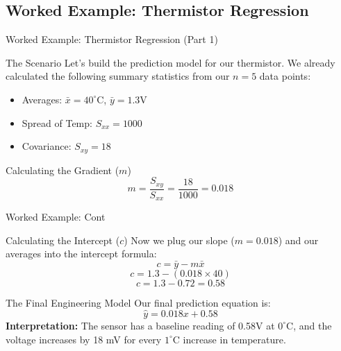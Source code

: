 \subsection{Worked Example: Thermistor Regression}
\begin{frame}{Worked Example: Thermistor Regression (Part 1)}
    \begin{block}{The Scenario}
        Let's build the prediction model for our thermistor. We already calculated the following summary statistics from our $n=5$ data points:
        \begin{itemize}
            \item Averages: $\bar{x} = 40^{\circ}\text{C}$, \hspace{0.5cm} $\bar{y} = 1.3\text{V}$
            \item Spread of Temp: $S_{xx} = 1000$
            \item Covariance: $S_{xy} = 18$
        \end{itemize}
    \end{block}

    \begin{block}{Calculating the Gradient ($m$)}
        $$m = \frac{S_{xy}}{S_{xx}} = \frac{18}{1000} = 0.018$$
    \end{block}
\end{frame}

\begin{frame}{Worked Example: Cont}
    \begin{block}{Calculating the Intercept ($c$)}
        Now we plug our slope ($m=0.018$) and our averages into the intercept formula:
        $$c = \bar{y} - m\bar{x}$$
        $$c = 1.3 - (0.018 \times 40)$$
        $$c = 1.3 - 0.72 = 0.58$$
    \end{block}

    \begin{block}{The Final Engineering Model}
        Our final prediction equation is:
        $$\hat{y} = 0.018x + 0.58$$
        \textbf{Interpretation:} The sensor has a baseline reading of 0.58V at $0^{\circ}\text{C}$, and the voltage increases by 18 mV for every $1^{\circ}\text{C}$ increase in temperature.
    \end{block}
\end{frame}


